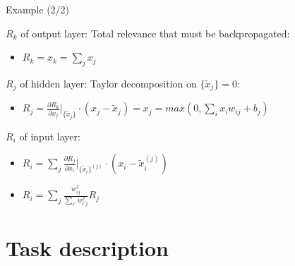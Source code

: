 \documentclass{beamer}
\begin{document}
\begin{frame}{Example (2/2)}

$R_k$ of output layer: Total relevance that must be backpropagated:
\begin{itemize}
\item $R_k = x_k = \sum_j x_j$ 
\end{itemize}

$R_j$ of hidden layer: Taylor decomposition on $\{ \tilde{x}_j \} = 0$:
\begin{itemize}
\item $R_j = \frac{\partial R_k}{\partial x_j} \biggr\rvert_{\{ \tilde{x}_j \}} \cdot (x_j - \tilde{x}_j) = x_j = max(0, \sum_i x_i w_{ij} + b_j)$ 
\end{itemize}

$R_i$ of input layer: 
\begin{itemize}
\item $R_i = \sum_j \frac{\partial R_j}{\partial x_i} \biggr\rvert_{\{ \tilde{x}_i \}^{(j)}} \cdot (x_i - \tilde{x}_i^{(j)})$
\item $R_i = \sum_j \frac{w_{ij}^2}{\sum_{i'} w_{i'j}^2} R_j$ 
\end{itemize}

\end{frame}

\section{Task description}
\end{document}
